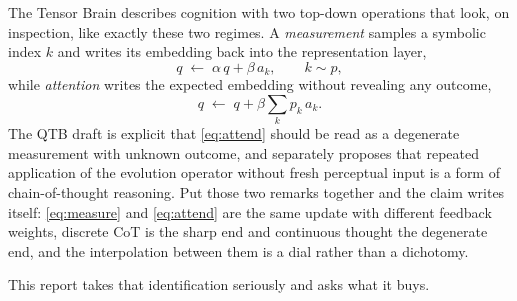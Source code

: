 \documentclass[11pt]{article}
\theoremstyle{definition}
\begin{document}
The Tensor Brain \citep{tresp2021tensorbrain,tresp2025bayes} describes cognition
with two top-down operations that look, on inspection, like exactly these two
regimes. A \emph{measurement} samples a symbolic index $k$ and writes its embedding
back into the representation layer,
\begin{equation}
q \;\leftarrow\; \alpha\,q + \beta\,a_k, \qquad k \sim p,
\label{eq:measure}
\end{equation}
while \emph{attention} writes the expected embedding without revealing any outcome,
\begin{equation}
q \;\leftarrow\; q + \beta \sum_k p_k\,a_k .
\label{eq:attend}
\end{equation}
The QTB draft is explicit that \eqref{eq:attend} should be read as a degenerate
measurement with unknown outcome, and separately proposes that repeated application
of the evolution operator without fresh perceptual input is a form of
chain-of-thought reasoning. Put those two remarks together and the claim writes
itself: \eqref{eq:measure} and \eqref{eq:attend} are the same update with different
feedback weights, discrete CoT is the sharp end and continuous thought the
degenerate end, and the interpolation between them is a dial rather than a
dichotomy.

This report takes that identification seriously and asks what it buys.
\end{document}
